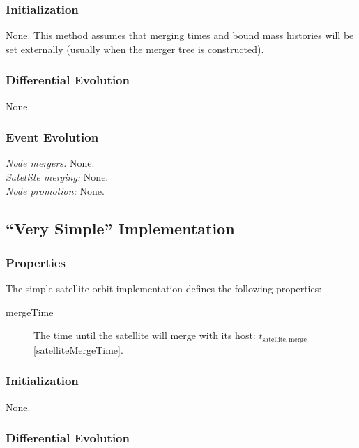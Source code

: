 \subsubsection{Initialization}

None. This method assumes that merging times and bound mass histories will be set externally (usually when the merger tree is constructed).

\subsubsection{Differential Evolution}

None.

\subsubsection{Event Evolution}

\noindent\emph{Node mergers:} None.\\

\noindent\emph{Satellite merging:} None.\\

\noindent\emph{Node promotion:} None.\\

\subsection{``Very Simple'' Implementation}

\subsubsection{Properties}

The simple satellite orbit implementation defines the following properties:
\begin{description}
 \item [{\normalfont \ttfamily mergeTime}] The time until the satellite will merge with its host: $t_\mathrm{satellite, merge}$ [{\normalfont \ttfamily satelliteMergeTime}].
\end{description}

\subsubsection{Initialization}

None.

\subsubsection{Differential Evolution}

